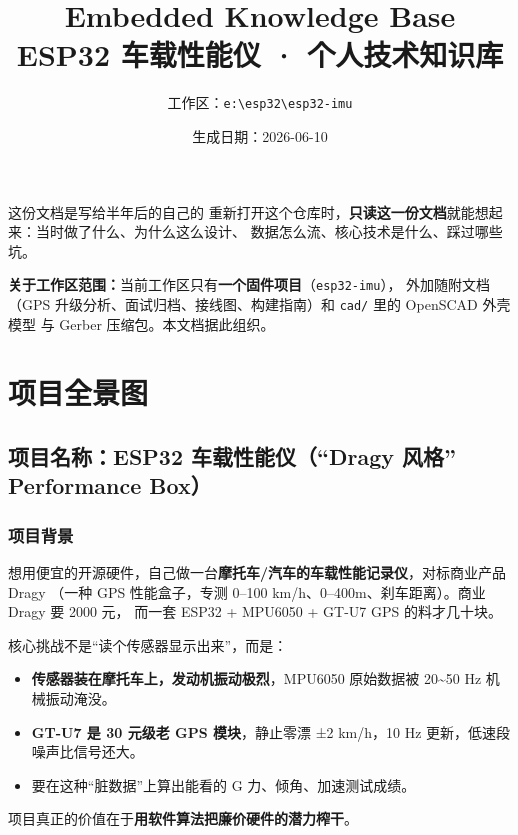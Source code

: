 \documentclass[UTF8,11pt,a4paper]{ctexart}
\title{\textbf{\Huge Embedded Knowledge Base}\\[6pt]
       \Large ESP32 车载性能仪 · 个人技术知识库}
\author{工作区：\texttt{e:\textbackslash esp32\textbackslash esp32-imu}}
\date{生成日期：2026-06-10}
\begin{document}
\maketitle

\begin{say}{这份文档是写给半年后的自己的}
重新打开这个仓库时，\textbf{只读这一份文档}就能想起来：当时做了什么、为什么这么设计、
数据怎么流、核心技术是什么、踩过哪些坑。
\end{say}

\vspace{4pt}
\noindent\textbf{关于工作区范围：}当前工作区只有\textbf{一个固件项目}（\texttt{esp32-imu}），
外加随附文档（GPS 升级分析、面试归档、接线图、构建指南）和 \texttt{cad/} 里的 OpenSCAD 外壳模型
与 Gerber 压缩包。本文档据此组织。

\tableofcontents
\newpage

\section{项目全景图}

\subsection{项目名称：ESP32 车载性能仪（“Dragy 风格” Performance Box）}

\subsubsection{项目背景}
想用便宜的开源硬件，自己做一台\textbf{摩托车/汽车的车载性能记录仪}，对标商业产品 Dragy
（一种 GPS 性能盒子，专测 0--100 km/h、0--400m、刹车距离）。商业 Dragy 要 2000 元，
而一套 ESP32 + MPU6050 + GT-U7 GPS 的料才几十块。

核心挑战不是“读个传感器显示出来”，而是：
\begin{itemize}
  \item \textbf{传感器装在摩托车上，发动机振动极烈}，MPU6050 原始数据被 20\textasciitilde 50 Hz 机械振动淹没。
  \item \textbf{GT-U7 是 30 元级老 GPS 模块}，静止零漂 ±2 km/h，10 Hz 更新，低速段噪声比信号还大。
  \item 要在这种“脏数据”上算出能看的 G 力、倾角、加速测试成绩。
\end{itemize}
项目真正的价值在于\textbf{用软件算法把廉价硬件的潜力榨干}。
\end{document}
